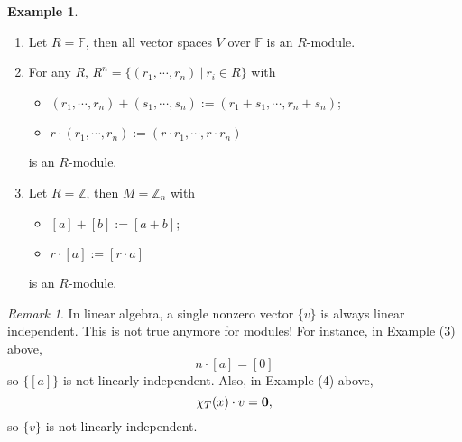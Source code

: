 \documentclass[11pt,openany]{book}
\theoremstyle{plain}
\theoremstyle{definition}
\newtheorem{example}[example]{Example}
\theoremstyle{remark}
\newtheorem{remark}[remark]{Remark}
\begin{document}
\begin{example}\label{eg-importanteg}
    \begin{enumerate}
        \item Let $R = \mathbb{F}$, then all vector spaces $V$ over $\mathbb{F}$ is an $R$-module.
        \item For any $R$, $R^{n} = \{ (r_1,\cdots,r_n) \ |\ r_i \in R \}$ with
            \begin{itemize}
                \item $(r_1,\cdots,r_n)+(s_1,\cdots,s_n) := (r_1+s_1,\cdots,r_n+s_n)$;
                \item $r \cdot (r_1,\cdots,r_n) := (r \cdot r_1,\cdots,r \cdot r_n)$
            \end{itemize}
            is an $R$-module.
        \item Let $R = \mathbb{Z}$, then $M = \mathbb{Z}_{n}$ with
            \begin{itemize}
                \item $[a]+[b]:=[a+b]$;
                \item $r \cdot [a]:=[r \cdot a]$
            \end{itemize}
            is an $R$-module.

    \end{enumerate}
\end{example}

\begin{remark}
    In linear algebra, a single nonzero vector $\{ v \}$ is always linear independent. This is not true anymore for modules! For instance, in Example (3) above, 
    $$n \cdot [a] = [0]$$
    so $\{[a]\}$ is not linearly independent. Also, in Example (4) above,
    $$\chi_T(x) \cdot v = {\bf 0},$$
    so $\{v\}$ is not linearly independent.
\end{remark}
\end{document}

